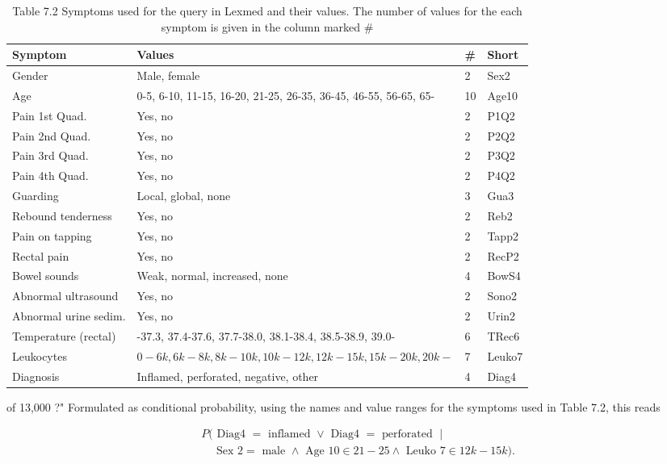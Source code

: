 \documentclass[10pt]{book}
\begin{document}
\begin{table}[htbp]
\begin{center}
\captionsetup{labelformat=empty}
\caption{Table 7.2 Symptoms used for the query in Lexmed and their values. The number of values for the each symptom is given in the column marked \#}
\begin{tabular}{|l|l|l|l|}
\hline
Symptom & Values & \# & Short \\

\hline
Gender & Male, female & 2 & Sex2 \\
\hline
Age & 0-5, 6-10, 11-15, 16-20, 21-25, 26-35, 36-45, 46-55, 56-65, 65- & 10 & Age10 \\
\hline
Pain 1st Quad. & Yes, no & 2 & P1Q2 \\
\hline
Pain 2nd Quad. & Yes, no & 2 & P2Q2 \\
\hline
Pain 3rd Quad. & Yes, no & 2 & P3Q2 \\
\hline
Pain 4th Quad. & Yes, no & 2 & P4Q2 \\
\hline
Guarding & Local, global, none & 3 & Gua3 \\
\hline
Rebound tenderness & Yes, no & 2 & Reb2 \\
\hline
Pain on tapping & Yes, no & 2 & Tapp2 \\
\hline
Rectal pain & Yes, no & 2 & RecP2 \\
\hline
Bowel sounds & Weak, normal, increased, none & 4 & BowS4 \\
\hline
Abnormal ultrasound & Yes, no & 2 & Sono2 \\
\hline
Abnormal urine sedim. & Yes, no & 2 & Urin2 \\
\hline
Temperature (rectal) & -37.3, 37.4-37.6, 37.7-38.0, 38.1-38.4, 38.5-38.9, 39.0- & 6 & TRec6 \\
\hline
Leukocytes & $0-6 k, 6 k-8 k, 8 k-10 k, 10 k-12 k, 12 k-15 k, 15 k-20 k, 20 k-$ & 7 & Leuko7 \\
\hline
Diagnosis & Inflamed, perforated, negative, other & 4 & Diag4 \\
\hline
\end{tabular}
\end{center}
\end{table}

of 13,000 ?" Formulated as conditional probability, using the names and value ranges for the symptoms used in Table 7.2, this reads

$$
\begin{aligned}
& P(\text { Diag4 }=\text { inflamed } \vee \text { Diag4 }=\text { perforated } \mid \\
& \quad \text { Sex } 2=\text { male } \wedge \text { Age } 10 \in 21-25 \wedge \text { Leuko } 7 \in 12 k-15 k) .
\end{aligned}
$$
\end{document}
